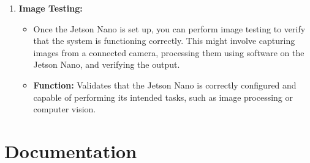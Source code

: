 \begin{enumerate}[label=\textbf{\arabic*.}]
	\item \textbf{Image Testing:}
	\begin{itemize}
		\item Once the Jetson Nano is set up, you can perform image testing to verify that the system is functioning correctly. This might involve capturing images from a connected camera, processing them using software on the Jetson Nano, and verifying the output.
		\item \textbf{Function:} Validates that the Jetson Nano is correctly configured and capable of performing its intended tasks, such as image processing or computer vision.
	\end{itemize}
\end{enumerate}

\newpage

\section{Documentation}


